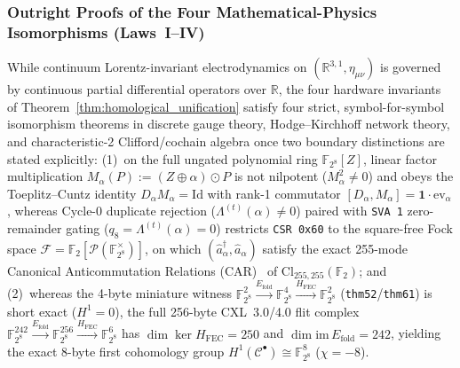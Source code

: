\documentclass[11pt,letterpaper]{article}
\theoremstyle{spectralthm}
\begin{document}
\subsubsection*{Outright Proofs of the Four Mathematical-Physics Isomorphisms (Laws~I--IV)}

While continuum Lorentz-invariant electrodynamics on $(\mathbb{R}^{3,1},\eta_{\mu\nu})$ is governed by continuous partial differential operators over $\mathbb{R}$, the four hardware invariants of Theorem~\ref{thm:homological_unification} satisfy four strict, symbol-for-symbol isomorphism theorems in discrete gauge theory, Hodge--Kirchhoff network theory, and characteristic-2 Clifford/cochain algebra once two boundary distinctions are stated explicitly: (1)~on the full ungated polynomial ring $\mathbb{F}_{2^8}[Z]$, linear factor multiplication $M_\alpha(P):=(Z\oplus\alpha)\odot P$ is not nilpotent ($M_\alpha^2\neq 0$) and obeys the Toeplitz--Cuntz identity $D_\alpha M_\alpha=\mathrm{Id}$ with rank-1 commutator $[D_\alpha,M_\alpha]=\mathbf{1}\cdot\mathrm{ev}_\alpha$, whereas Cycle-0 duplicate rejection ($\Lambda^{(t)}(\alpha)\neq 0$) paired with \texttt{SVA~1\textquotesingle} zero-remainder gating ($q_8=\Lambda^{(t)}(\alpha)=0$) restricts \texttt{CSR 0x60} to the square-free Fock space $\mathcal{F}=\mathbb{F}_2[\mathcal{P}(\mathbb{F}_{2^8}^\times)]$, on which $(\hat{a}_\alpha^\dagger,\hat{a}_\alpha)$ satisfy the exact 255-mode Canonical Anticommutation Relations (CAR)~\cite{jordan1928pauli} of $\mathrm{Cl}_{255,255}(\mathbb{F}_2)$; and (2)~whereas the 4-byte miniature witness $\mathbb{F}_{2^8}^2 \xrightarrow{E_{\mathrm{fold}}} \mathbb{F}_{2^8}^4 \xrightarrow{H_{\mathrm{FEC}}} \mathbb{F}_{2^8}^2$ (\texttt{thm52}/\texttt{thm61}) is short exact ($H^1=0$), the full 256-byte CXL~3.0/4.0 flit complex $\mathbb{F}_{2^8}^{242} \xrightarrow{E_{\mathrm{fold}}} \mathbb{F}_{2^8}^{256} \xrightarrow{H_{\mathrm{FEC}}} \mathbb{F}_{2^8}^6$ has $\dim\ker H_{\mathrm{FEC}}=250$ and $\dim\mathrm{im}\,E_{\mathrm{fold}}=242$, yielding the exact 8-byte first cohomology group $H^1(\mathcal{C}^\bullet)\cong\mathbb{F}_{2^8}^8$ ($\chi=-8$).
\end{document}
